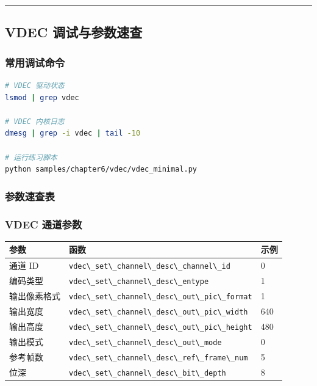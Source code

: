 \begin{center}\rule{0.5\linewidth}{0.5pt}\end{center}

\subsection{VDEC 调试与参数速查}\label{src-book-chapter6-h81}

\subsubsection{常用调试命令}\label{src-book-chapter6-h82}

\begin{lstlisting}[language=bash]
# VDEC 驱动状态
lsmod | grep vdec

# VDEC 内核日志
dmesg | grep -i vdec | tail -10

# 运行练习脚本
python samples/chapter6/vdec/vdec_minimal.py
\end{lstlisting}

\subsubsection{参数速查表}\label{src-book-chapter6-h83}

\subsubsection{VDEC 通道参数}\label{vdec-params}

\begin{longtable}[]{@{}lll@{}}
\toprule\noalign{}
参数 & 函数 & 示例 \\
\midrule\noalign{}
\endhead
\bottomrule\noalign{}
\endlastfoot
通道 ID &
\passthrough{\lstinline!vdec\_set\_channel\_desc\_channel\_id!} & 0 \\
编码类型 & \passthrough{\lstinline!vdec\_set\_channel\_desc\_entype!} &
1 \\
输出像素格式 &
\passthrough{\lstinline!vdec\_set\_channel\_desc\_out\_pic\_format!} &
1 \\
输出宽度 &
\passthrough{\lstinline!vdec\_set\_channel\_desc\_out\_pic\_width!} &
640 \\
输出高度 &
\passthrough{\lstinline!vdec\_set\_channel\_desc\_out\_pic\_height!} &
480 \\
输出模式 & \passthrough{\lstinline!vdec\_set\_channel\_desc\_out\_mode!}
& 0 \\
参考帧数 &
\passthrough{\lstinline!vdec\_set\_channel\_desc\_ref\_frame\_num!} &
5 \\
位深 & \passthrough{\lstinline!vdec\_set\_channel\_desc\_bit\_depth!} &
8 \\
\end{longtable}

